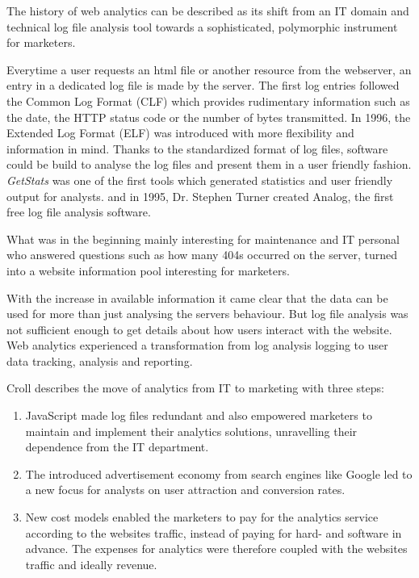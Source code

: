 The history of web analytics can be described as its shift from an IT domain and technical log file analysis tool towards a sophisticated, polymorphic instrument for marketers.


Everytime a user requests an html file or another resource from the webserver, an entry in a dedicated log file is made by the server. %
The first log entries followed the Common Log Format (CLF) which provides rudimentary information such as the date, the HTTP status code or the number of bytes transmitted.
In 1996, the Extended Log Format (ELF) was introduced with more flexibility and information in mind.
Thanks to the standardized format of log files, software could be build to analyse the log files and present them in a user friendly fashion.
\textit{GetStats} was one of the first tools which generated statistics and user friendly output for analysts.
and in 1995, Dr. Stephen Turner created Analog, the first free log file analysis software.%


What was in the beginning mainly interesting for maintenance and IT personal who answered questions such as how many 404s occurred on the server, turned into a website information pool interesting for marketers.

With the increase in available information it came clear that the data can be used for more than just analysing the servers behaviour.
But log file analysis was not sufficient enough to get details about how users interact with the website.
Web analytics experienced a transformation from log analysis logging to user data tracking, analysis and reporting.

Croll describes the move of analytics from IT to marketing with three steps: %
\begin{enumerate}
\item JavaScript made log files redundant and also empowered marketers to maintain and implement their analytics solutions, unravelling their dependence from the IT department.
\item The introduced advertisement economy from search engines like Google led to a new focus for analysts on user attraction and conversion rates.
\item New cost models enabled the marketers to pay for the analytics service according to the websites traffic, instead of paying for hard- and software in advance. The expenses for analytics were therefore coupled with the websites traffic and ideally revenue.
\end{enumerate}


